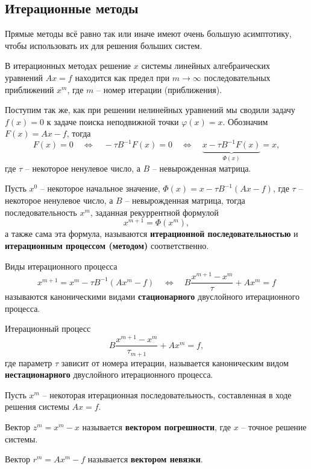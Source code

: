 \documentclass{article}
\begin{document}
\subsection{Итерационные методы}
Прямые методы всё равно так или иначе имеют очень большую асимптотику, чтобы
использовать их для решения больших систем.

В итерационных методах решение $x$ системы линейных алгебраических уравнений
$Ax=f$ находится как предел при $m\to\infty$ последовательных приближений $x^m$,
где $m$ -- номер итерации (приближения).

Поступим так же, как при решении нелинейных уравнений мы сводили задачу $f(x)=0$
к задаче поиска неподвижной точки $\varphi(x)=x$. Обозначим $F(x)=Ax-f$, тогда
\[F(x)=0\quad\Leftrightarrow\quad -\tau B^{-1}F(x)=0\quad\Leftrightarrow\quad
\underset{\Phi(x)}{\underbrace{x-\tau B^{-1}F(x)}}=x,\]
где $\tau$ -- некоторое ненулевое число, а $B$ -- невырожденная матрица.

\begin{define}\label{eq:sle_iterative_method}
	Пусть $x^0$ -- некоторое начальное значение, $\Phi(x)=x-\tau
	B^{-1}(Ax-f)$, где $\tau$ -- некоторое ненулевое число, а $B$ --
	невырожденная матрица, тогда последовательность $x^m$, заданная
	рекуррентной формулой
	\[x^{m+1}=\Phi(x^m),\]
	а также сама эта формула, называются \textbf{итерационной
	последовательностью} и \textbf{итерационным процессом (методом)}
	соответственно.
\end{define}

\begin{define}\label{eq:static_canon_process}
	Виды итерационного процесса
	\[x^{m+1}=x^m-\tau B^{-1}(Ax^m-f)\quad\Leftrightarrow\quad
	B\frac{x^{m+1}-x^m}{\tau}+Ax^m=f\]
	называются каноническими видами \textbf{стационарного} двуслойного
	итерационного процесса.
\end{define}

\begin{define}
	Итерационный процесс
	\[B\frac{x^{m+1}-x^m}{\tau_{m+1}}+Ax^m=f,\]
	где параметр $\tau$ зависит от номера итерации, называется каноническим
	видом \textbf{нестационарного} двуслойного итерационного процесса.
\end{define}

\begin{define}
	Пусть $x^m$ -- некоторая итерационная последовательность, составленная
	в ходе решения системы $Ax=f$.

	Вектор $z^m=x^m-x$ называется \textbf{вектором погрешности}, где $x$ --
	точное решение системы.

	Вектор $r^m=Ax^m-f$ называется \textbf{вектором невязки}.
\end{define}
\end{document}
